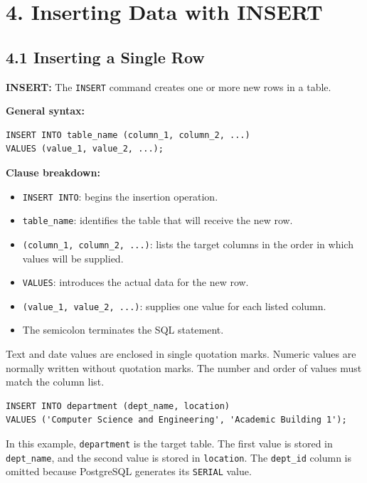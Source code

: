 \documentclass[12pt,a4paper]{article}
\newcommand{\defbox}[2]{%
  \vspace{0.2cm}
  \noindent\colorbox{boxgray}{\parbox{\dimexpr\linewidth-2\fboxsep}{%
    \textbf{#1:} #2
  }}
  \vspace{0.2cm}
}
\begin{document}
\section*{4. Inserting Data with INSERT}

\subsection*{4.1 Inserting a Single Row}
\defbox{INSERT}{The \texttt{INSERT} command creates one or more new rows in a table.}

\noindent\textbf{General syntax:}
\begin{verbatim}
INSERT INTO table_name (column_1, column_2, ...)
VALUES (value_1, value_2, ...);
\end{verbatim}

\noindent\textbf{Clause breakdown:}
\begin{itemize}
    \item \texttt{INSERT INTO}: begins the insertion operation.
    \item \texttt{table\_name}: identifies the table that will receive the new row.
    \item \texttt{(column\_1, column\_2, ...)}: lists the target columns in the order in which values will be supplied.
    \item \texttt{VALUES}: introduces the actual data for the new row.
    \item \texttt{(value\_1, value\_2, ...)}: supplies one value for each listed column.
    \item The semicolon terminates the SQL statement.
\end{itemize}

Text and date values are enclosed in single quotation marks. Numeric values are normally written
without quotation marks. The number and order of values must match the column list.

\begin{verbatim}
INSERT INTO department (dept_name, location)
VALUES ('Computer Science and Engineering', 'Academic Building 1');
\end{verbatim}

\noindent In this example, \texttt{department} is the target table. The first value is stored in
\texttt{dept\_name}, and the second value is stored in \texttt{location}. The
\texttt{dept\_id} column is omitted because PostgreSQL generates its \texttt{SERIAL} value.
\end{document}

